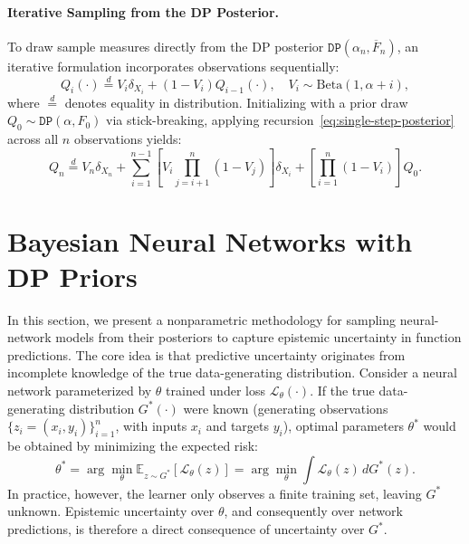 \documentclass[10pt]{article}
\newcommand{\DP}{\texttt{DP}}
\begin{document}
\paragraph{Iterative Sampling from the DP Posterior.}
To draw sample measures directly from the DP posterior $\DP(\alpha_n, \overline{F}_n)$, an iterative formulation \citep{blackwell1973ferguson, sethuraman1994constructive} incorporates observations sequentially:
\begin{equation}\label{eq:single-step-posterior}
Q_{i}(\cdot) \stackrel{d}{=} V_{i}\delta_{X_{i}} + (1-V_{i})Q_{i-1}(\cdot), \quad V_{i} \sim \mathrm{Beta}(1, \alpha + i),
\end{equation}
where $\stackrel{d}{=}$ denotes equality in distribution. Initializing with a prior draw $Q_0 \sim \DP(\alpha, F_0)$ via stick-breaking, applying recursion~\eqref{eq:single-step-posterior} across all $n$ observations yields:
\begin{equation}\label{eq:multi-step-posterior}
Q_{n} \stackrel{d}{=} V_{n}\delta_{X_{n}} + \sum_{i=1}^{n-1}\left[V_{i}\prod_{j=i+1}^{n}(1-V_{j})\right]\delta_{X_{i}} + \left[\prod_{i=1}^{n}(1-V_{i})\right] Q_{0}.
\end{equation}


\section{Bayesian Neural Networks with DP Priors}
\label{sec:DP-BNNs}

In this section, we present a nonparametric methodology for sampling neural-network models from their posteriors to capture epistemic uncertainty in function predictions. The core idea is that predictive uncertainty originates from incomplete knowledge of the true data-generating distribution. Consider a neural network parameterized by $\theta$ trained under loss $\mathcal{L}_{\theta}(\cdot)$. If the true data-generating distribution $G^*(\cdot)$ were known (generating observations $\{z_i = (x_i, y_i)\}_{i=1}^n$, with inputs $x_i$ and targets $y_i$), optimal parameters $\theta^*$ would be obtained by minimizing the expected risk:
\begin{equation}\label{Eq:convoluted-loss}
\theta^* = \arg \min_{\theta} \mathbb{E}_{z \sim G^*}[\mathcal{L}_{\theta}(z)] = \arg \min_{\theta} \int \mathcal{L}_{\theta}(z) \, dG^*(z).
\end{equation}
In practice, however, the learner only observes a finite training set, leaving $G^*$ unknown. Epistemic uncertainty over $\theta$, and consequently over network predictions, is therefore a direct consequence of uncertainty over $G^*$.
\end{document}
